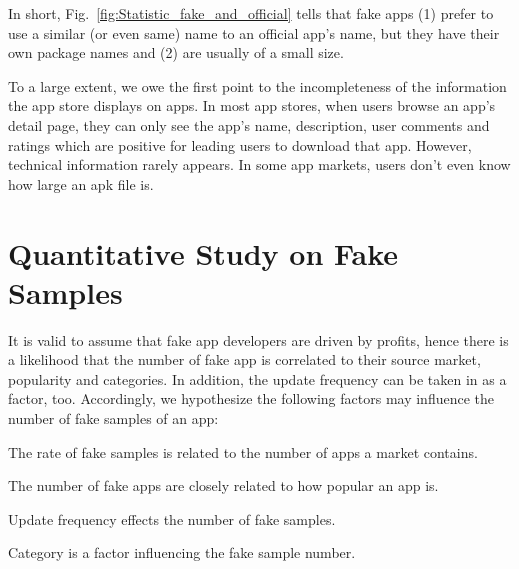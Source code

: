 In short, Fig.~\ref{fig:Statistic_fake_and_official} tells that fake apps
(1) prefer to use a similar (or even same) name to an official app's name, but they have their own package names and
(2) are usually of a small size.

To a large extent, we owe the first point to the incompleteness of the information the app store displays on apps.
In most app stores, when users browse an app's detail page, they can only see the app's name, description, user comments and ratings which are positive for leading users to download that app.
However, technical information rarely appears.
In some app markets, users don't even know how large an apk file is.

\vspace{1mm}
\noindent{}

\section{Quantitative Study on Fake Samples}
It is valid to assume that fake app developers are driven by profits, hence there is a likelihood that the number of fake app is correlated to their source market, popularity and categories.
In addition, the update frequency can be taken in as a factor, too.
Accordingly, we hypothesize the following factors may influence the number of fake samples of an app:

 {The rate of fake samples is related to the number of apps a market contains.}

 The number of fake apps are closely related to how popular an app is.

 Update frequency effects the number of fake samples.

 Category is a factor influencing the fake sample number.

